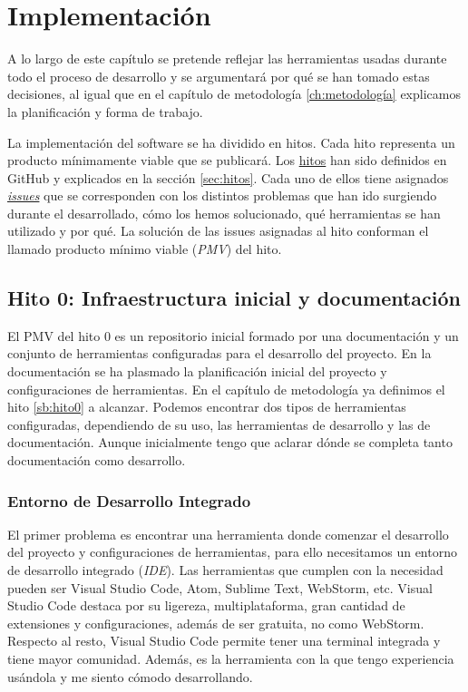 \UseRawInputEncoding
\chapter{Implementación}

A lo largo de este capítulo se pretende reflejar las herramientas usadas durante todo el proceso de desarrollo y
se argumentará por qué se han tomado estas decisiones, al igual que en el capítulo de metodología \ref{ch:metodología} explicamos
la planificación y forma de trabajo.

La implementación del software se ha dividido en hitos. Cada hito representa un producto mínimamente viable que se publicará.
Los \href{https://github.com/RubenDelgadoPareja/TFG-Triage-Inteligente-Consulta-Medica/milestones}{hitos} han sido definidos en GitHub y explicados en la sección \ref{sec:hitos}.
Cada uno de ellos tiene asignados \href{https://github.com/RubenDelgadoPareja/TFG-Triage-Inteligente-Consulta-Medica/issues}{\textit{issues}} que se corresponden
con los distintos problemas que han ido surgiendo durante el desarrollado, cómo los hemos solucionado, qué herramientas se han utilizado y por qué.
La solución de las issues asignadas al hito conforman el llamado producto mínimo viable (\textit{PMV}) del hito.

\section{Hito 0: Infraestructura inicial y documentación}

El PMV del hito 0 es un repositorio inicial formado por una documentación y un conjunto de herramientas configuradas para el desarrollo del proyecto.
En la documentación se ha plasmado la planificación inicial del proyecto y configuraciones de herramientas. En el capítulo de metodología ya definimos el hito \ref{sb:hito0} a alcanzar.
Podemos encontrar dos tipos de herramientas configuradas, dependiendo de su uso, las herramientas de desarrollo y las de documentación.
Aunque inicialmente tengo que aclarar dónde se completa tanto documentación como desarrollo.

\subsection{Entorno de Desarrollo Integrado}
El primer problema es encontrar una herramienta donde comenzar el desarrollo del proyecto y configuraciones de herramientas, para ello necesitamos un entorno de desarrollo integrado (\textit{IDE}).
Las herramientas que cumplen con la necesidad pueden ser Visual Studio Code, Atom, Sublime Text, WebStorm, etc.
Visual Studio Code destaca por su ligereza, multiplataforma, gran cantidad de extensiones y configuraciones, además de ser gratuita, no como WebStorm.
Respecto al resto, Visual Studio Code permite tener una terminal integrada y tiene mayor comunidad. Además, es la herramienta con la que tengo experiencia usándola y me siento cómodo desarrollando.

